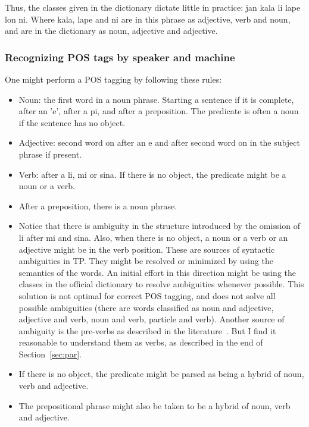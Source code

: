 \documentclass{article}
\begin{document}
Thus, the classes given in the dictionary dictate little
in practice:
jan kala li lape lon ni.
Where kala, lape and ni are in this phrase
as adjective, verb and noun,
and are in the dictionary as noun,
adjective and adjective.

\subsubsection{Recognizing POS tags by speaker and machine}
One might perform a POS tagging by following these rules:
\begin{itemize}
  \item Noun: the first word in a noun phrase.
    Starting a sentence if it is complete,
    after an 'e', after a pi, and after a preposition.
    The predicate is often a noun
    if the sentence has no object.
  \item Adjective: second word on after an e and after
    second word on in the subject phrase if present.
  \item Verb: after a li, mi or sina.
    If there is no object, the predicate
    might be a noun or a verb.
  \item After a preposition,
    there is a noun phrase.
  \item Notice that there is ambiguity in the structure
    introduced by the omission of li after mi and sina.
    Also, when there is no object, a noun or a verb
    or an adjective might be in the verb position.
    These are sources of syntactic ambiguities
    in TP.
    They might be resolved or minimized by using the semantics
    of the words.
    An initial effort in this direction might be
    using the classes in the official dictionary to resolve
    ambiguities whenever possible.
    This solution is not optimal for correct POS tagging,
    and does not solve all possible ambiguities
    (there are words classified as noun and adjective,
    adjective and verb, noun and verb, particle and verb).
    Another source of ambiguity is the pre-verbs as described
    in the literature~\cite{tpLang,kama}.
    But I find it reasonable to understand them as verbs,
    as described in the end of Section~\ref{sec:par}.
  \item If there is no object, the predicate might be parsed
as being a hybrid of noun, verb and adjective.
  \item The prepositional phrase might also be taken to be a hybrid
    of noun, verb and adjective.
\end{itemize}
\end{document}
